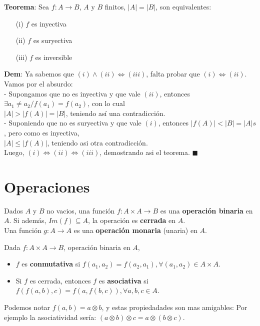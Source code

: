 \documentclass[11pt,a4paper]{article}
\newcommand*{\QEDA}{\null\nobreak\hfill\ensuremath{\blacksquare}}
\begin{document}
\noindent \textbf{Teorema}: Sea $f:A \rightarrow B$, $A$ y $B$ finitos, $|A| = |B|$, son equivalentes:
\begin{multicols}{3}
\begin{enumerate}
\item[(i)] $f$ es inyectiva
\item[(ii)] $f$ es suryectiva
\item[(iii)] $f$ es inversible
\end{enumerate}
\end{multicols}
\noindent \textbf{Dem}: Ya sabemos que $(i)\land(ii) \iff (iii)$, falta probar que $(i)\iff(ii)$. Vamos por el absurdo:\\
- Supongamos que no es inyectiva y que vale $(ii)$, entonces $\exists a_1 \not = a_2 / f(a_1) = f(a_2)$, con lo cual\\ \indent $|A|>|f(A)|=|B|$, teniendo as\'i una contradicci\'on.\\
- Suponiendo que no es suryectiva y que vale $(i)$, entonces $|f(A)| < |B| = |A|s$, pero como es inyectiva,\\ \indent $|A| \leq |f(A)|$, teniendo asi otra contradicci\'on. \\
Luego, $(i)\iff(ii)\iff(iii)$, demostrando asi el teorema. \QEDA


\newpage
\section{Operaciones}
\noindent Dados $A$ y $B$ no vacios, una funci\'on $f : A \times A \rightarrow B$ es una \textbf{operaci\'on binaria} en $A$. Si adem\'as, $Im(f) \subseteq A$, la operaci\'on es \textbf{cerrada} en $A$.\\

\noindent Una funci\'on $g : A \rightarrow A$ es una \textbf{operaci\'on monaria} (unaria) en $A$.\\

\noindent \dotfill


\noindent Dada $f: A \times A \rightarrow B$, operaci\'on binaria en $A$, 
\begin{itemize}
\item $f$ es \textbf{conmutativa} si $f(a_1, a_2) = f(a_2, a_1), \forall (a_1, a_2) \in A \times A$.
\item Si $f$ es cerrada, entonces $f$ es \textbf{asociativa} si $f(f(a,b), c) = f(a,f(b,c)), \forall a,b,c \in A$.
\end{itemize}
\noindent Podemos notar $f(a,b) = a \otimes b$, y estas propiedadades son mas amigables: Por ejemplo la asociatividad ser\'ia: $(a \otimes b) \otimes c = a \otimes (b \otimes c)$.\\
\end{document}
